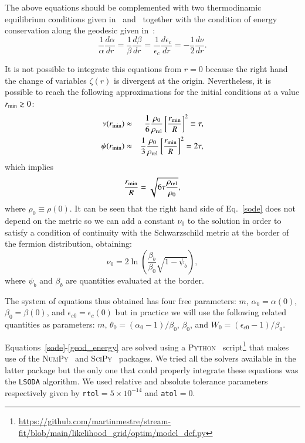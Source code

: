 \documentclass[twocolumn]{aa}
\begin{document}
The above equations should be complemented with two thermodinamic equilibrium conditions given
in~\citet{PhysRev.35.904} and~\citet{RevModPhys.21.531} together with the condition of energy conservation
along the geodesic given in~\citet{1989A&A...221....4M}:
\begin{equation}
   \frac{1}{\alpha}\frac{d\alpha}{dr}=\frac{1}{\beta}\frac{d\beta}{dr}=
   \frac{1}{\epsilon_c}\frac{d\epsilon_c}{dr}=-\frac{1}{2}\frac{d\nu}{dr}.
   \label{geod_energy}
\end{equation}

It is not possible to integrate this equations from $r=0$ because the right hand the change of variables $\zeta(r)$ is divergent at the origin. Nevertheless, it is possible
to reach the following approximations for the initial conditions at a value $r_{\rm{min}}\gtrsim 0$:
\begin{eqnarray}
   \nu(r_{\rm{min}}) &\approx& \frac{1}{6}\frac{\rho_0}{\rho_{\rm{rel}}}\left[\frac{r_{\rm{min}}}{R}\right]^2\equiv\tau, \\
   \psi(r_{\rm{min}})&\approx&\frac{1}{3}\frac{\rho_0}{\rho_{\rm{rel}}}\left[\frac{r_{\rm{min}}}{R}\right]^2=2\tau,
\end{eqnarray}
which implies
\begin{equation}
   \frac{r_{\rm{min}}}{R}=\sqrt{6\tau\frac{\rho_{\rm{rel}}}{\rho_0}},
\end{equation}
where $\rho_0\equiv \rho(0)$.
It can be seen that the right hand side of Eq.~\ref{sode} does not depend on the metric so we can add
a constant $\nu_0$ to the solution in order to satisfy a condition of continuity with the Schwarzschild metric at the border of the fermion distribution, obtaining:
$$\nu_0 = 2\ln\left(\frac{\beta_b}{\beta_0}\sqrt{1-\psi_b}\right),$$
where $\psi_b$ and $\beta_b$ are quantities evaluated at the border.

The system of equations thus obtained has four free parameters: $m$, $\alpha_0=\alpha(0)$,
$\beta_0=\beta(0)$, and $\epsilon_{c0}=\epsilon_c(0)$ but in practice we will use the following related
quantities as parameters:
$m$, $\theta_0=(\alpha_0-1)/\beta_0$, $\beta_0$, and $W_0=(\epsilon_{c0}-1)/\beta_0$.

Equations~\ref{sode}-\ref{geod_energy} are solved using a {\scshape{Python}}~\citep{van1995python} script\footnote{\url{https://github.com/martinmestre/stream-fit/blob/main/likelihood_grid/optim/model_def.py}} that makes use of the {\scshape{NumPy}}~\citep{2020SciPy-NMeth} and {\scshape{SciPy}}~\citep{harris2020array} packages. We tried all the solvers available in the latter package but the only one that
could properly integrate these equations was the \texttt{LSODA} algorithm. We used relative and absolute tolerance parameters respectively given by \texttt{rtol}$=5\times10^{-14}$ and \texttt{atol}$=0$.
\end{document}
